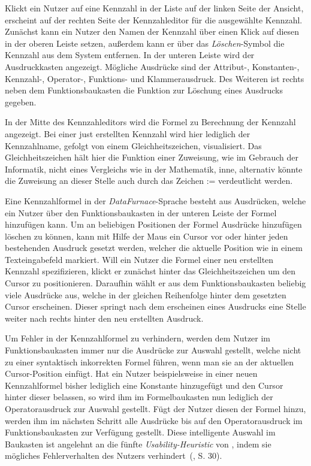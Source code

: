 \documentclass[
  language=german, %
  type=bachelor%
]{isthesis}
\begin{document}
\begin{content}
  Klickt ein Nutzer auf eine Kennzahl in der Liste auf der linken Seite der
  Ansicht, erscheint auf der rechten Seite der Kennzahleditor für die
  ausgewählte Kennzahl. Zunächst kann ein Nutzer den Namen der Kennzahl über
  einen Klick auf diesen in der oberen Leiste setzen, außerdem kann er über das
  \textit{Löschen}-Symbol die Kennzahl aus dem System entfernen. In der unteren
  Leiste wird der Ausdruckkasten angezeigt. Mögliche Ausdrücke sind der
  Attribut-, Konstanten-, Kennzahl-, Operator-, Funktions- und Klammerausdruck.
  Des Weiteren ist rechts neben dem Funktionsbaukasten die Funktion zur
  Löschung eines Ausdrucks gegeben.

  In der Mitte des Kennzahleditors wird die Formel zu Berechnung der Kennzahl
  angezeigt. Bei einer just erstellten Kennzahl wird hier lediglich der
  Kennzahlname, gefolgt von einem Gleichheitszeichen, visualisiert. Das
  Gleichheitszeichen hält hier die Funktion einer Zuweisung, wie im Gebrauch
  der Informatik, nicht eines Vergleichs wie in der Mathematik, inne,
  alternativ könnte die Zuweisung an dieser Stelle auch durch das Zeichen
  \glqq{}:=\grqq{} verdeutlicht werden. 
  
  Eine Kennzahlformel in der \textit{DataFurnace}-Sprache besteht aus
  Ausdrücken, welche ein Nutzer über den Funktionsbaukasten in der unteren
  Leiste der Formel hinzufügen kann. Um an beliebigen Positionen der Formel
  Ausdrücke hinzufügen \bzw{} löschen zu können, kann mit Hilfe der Maus ein
  Cursor vor oder hinter jeden bestehenden Ausdruck gesetzt werden, welcher die
  aktuelle Position wie in einem Texteingabefeld markiert. Will ein Nutzer die
  Formel einer neu erstellten Kennzahl spezifizieren, klickt er zunächst hinter
  das Gleichheitszeichen um den Cursor zu positionieren.  Daraufhin wählt er
  aus dem Funktionsbaukasten beliebig viele Ausdrücke aus, welche in der
  gleichen Reihenfolge hinter dem gesetzten Cursor erscheinen.  Dieser springt
  nach dem erscheinen eines Ausdrucks eine Stelle weiter nach rechts hinter den
  neu erstellten Ausdruck. 

  Um Fehler in der Kennzahlformel zu verhindern, werden dem Nutzer im
  Funktionsbaukasten immer nur die Ausdrücke zur Auswahl gestellt, welche nicht
  zu einer syntaktisch inkorrekten Formel führen, wenn man sie an der aktuellen
  Cursor-Position einfügt. Hat ein Nutzer beispielsweise in einer neuen
  Kennzahlformel bisher lediglich eine Konstante hinzugefügt und den Cursor
  hinter dieser belassen, so wird ihm im Formelbaukasten nun lediglich der
  Operatorausdruck zur Auswahl gestellt. Fügt der Nutzer diesen der Formel
  hinzu, werden ihm im nächsten Schritt alle Ausdrücke bis auf den
  Operatorausdruck im Funktionsbaukasten zur Verfügung gestellt. Diese
  intelligente Auswahl im Baukasten ist angelehnt an die fünfte
  \textit{Usability-Heuristic} von \textsc{\citeauthor{nielsen1994heuristic}},
  indem sie mögliches Fehlerverhalten des Nutzers
  verhindert~(\citeyear{nielsen1994heuristic}, S. 30).


\end{content}
\end{document}
